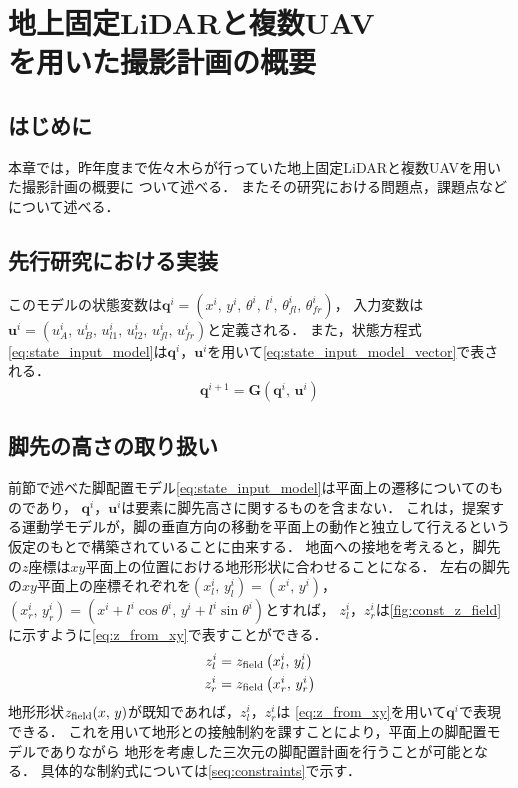 \documentclass[autodetect-engine,dvipdfmx-if-dvi,ja=standard,a4j,jbase=11pt,magstyle=nomag*]{bxjsreport}
\begin{document}
\chapter[地上固定LiDARと複数UAVを用いた撮影計画の概要]{地上固定LiDARと複数UAV\\を用いた撮影計画の概要}

\section{はじめに}
本章では，昨年度まで佐々木らが行っていた地上固定LiDARと複数UAVを用いた撮影計画の概要に
ついて述べる．\cite{sasaki_2019}
またその研究における問題点，課題点などについて述べる．

\section{先行研究における実装}







このモデルの状態変数は$\bm{q}^i = ( x^i ,\, y^i ,\, \theta^i ,\, l^i ,\, \theta_{fl}^i ,\, \theta_{fr}^i )$，
入力変数は$\bm{u}^i = ( u_A^i ,\, u_B^i ,\, u_{l1}^i ,\, u_{l2}^i ,\, u_{fl}^i ,\, u_{fr}^i )$と定義される．
また，状態方程式\cref{eq:state_input_model}は$\bm{q}^i$，$\bm{u}^i$を用いて\cref{eq:state_input_model_vector}で表される．
\begin{equation} \label{eq:state_input_model_vector}
    \bm{q}^{i + 1} = \bm{G} \left( \bm{q}^i ,\, \bm{u}^i \right)
\end{equation}


\section{脚先の高さの取り扱い}


前節で述べた脚配置モデル\cref{eq:state_input_model}は平面上の遷移についてのものであり，
$\bm{q}^i$，$\bm{u}^i$は要素に脚先高さに関するものを含まない．
これは，提案する運動学モデルが，脚の垂直方向の移動を平面上の動作と独立して行えるという
仮定のもとで構築されていることに由来する．
地面への接地を考えると，脚先の$z$座標は$xy$平面上の位置における地形形状に合わせることになる．
左右の脚先の$xy$平面上の座標それぞれを$( x_l^i ,\, y_l^i ) = ( x^i ,\, y^i )$，
$( x_r^i ,\, y_r^i ) = ( x^i + l^i \cos \theta^i ,\, y^i + l^i \sin \theta^i )$とすれば，
$z_l^i$，$z_r^i$は\cref{fig:const_z_field}に示すように\cref{eq:z_from_xy}で表すことができる．
\begin{equation}
    \label{eq:z_from_xy}
    \begin{aligned}
        z_l^i & = z_{\mathrm{field}} \left( x_l^i ,\, y_l^i \right) \\
        z_r^i & = z_{\mathrm{field}} \left( x_r^i ,\, y_r^i \right)
    \end{aligned}
\end{equation}
地形形状$z_{\mathrm{field}} ( x ,\, y )$が既知であれば，$z_l^i$，$z_r^i$は
\cref{eq:z_from_xy}を用いて$\bm{q}^i$で表現できる．
これを用いて地形との接触制約を課すことにより，平面上の脚配置モデルでありながら
地形を考慮した三次元の脚配置計画を行うことが可能となる．
具体的な制約式については\cref{seq:constraints}で示す．
\end{document}
